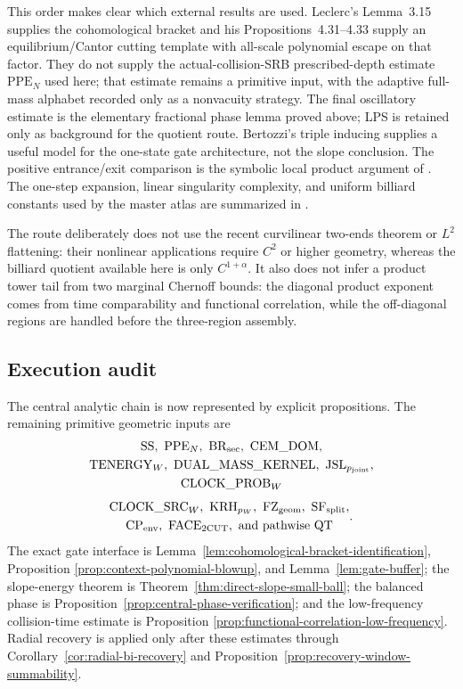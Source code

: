 \documentclass[11pt]{article}
\begin{document}
This order makes clear which external results are used.  Leclerc's
Lemma~3.15 supplies the cohomological bracket and his
Propositions~4.31--4.33 supply an equilibrium/Cantor cutting template with
all-scale polynomial escape on that factor.  They do not supply the
actual-collision-SRB prescribed-depth estimate $\mathrm{PPE}_{N}$ used here;
that estimate remains a primitive input, with the adaptive full-mass alphabet
recorded only as a nonvacuity strategy.
The final oscillatory estimate is the elementary fractional phase lemma
proved above; LPS is retained only as background for the quotient route.
Bertozzi's triple inducing supplies a useful model for the one-state gate
architecture, not the slope conclusion.  The positive entrance/exit comparison is the symbolic local
product argument of \cite{ClimenhagaLPS}.  The
one-step expansion, linear singularity complexity, and uniform billiard
constants used by the master atlas are summarized in \cite{DLreview}.

The route deliberately does not use the recent curvilinear two-ends theorem
or $L^2$ flattening: their nonlinear applications require $C^2$ or higher
geometry, whereas the billiard quotient available here is only
$C^{1+\alpha}$.  It also does not infer a product tower tail from two
marginal Chernoff bounds: the diagonal product exponent comes from time
comparability and functional correlation, while the off-diagonal regions are
handled before the three-region assembly.

\subsection{Execution audit}

The central analytic chain is now represented by explicit propositions.
The remaining primitive geometric inputs are
\[
 \begin{gathered}
 \mathrm{SS},\ \mathrm{PPE}_{N},\ \mathrm{BR}_{\rm sec},\
 \mathrm{CEM\_DOM},\\
 \mathrm{TENERGY}_{W},\ \mathrm{DUAL\_MASS\_KERNEL},\ \mathrm{JSL}_{p_{\rm joint}},\\
 \mathrm{CLOCK\_PROB}_{W}
 \end{gathered}
\]
\[
 \begin{gathered}
 \mathrm{CLOCK\_SRC}_{W},\ \mathrm{KRH}_{p_W},\
 \mathrm{FZ}_{\rm geom},\ \mathrm{SF}_{\rm split},\\
 \mathrm{CP}_{\rm env},\ \mathrm{FACE}_{\rm 2CUT},\
 \text{and pathwise }\mathrm{QT}
 \end{gathered}.
\]
The exact gate interface is
Lemma~\ref{lem:cohomological-bracket-identification}, Proposition
\ref{prop:context-polynomial-blowup}, and Lemma~\ref{lem:gate-buffer}; the
slope-energy theorem is Theorem~\ref{thm:direct-slope-small-ball}; the
balanced phase is Proposition~\ref{prop:central-phase-verification}; and the
low-frequency collision-time estimate is Proposition
\ref{prop:functional-correlation-low-frequency}.  Radial recovery is applied
only after these estimates through Corollary~\ref{cor:radial-bi-recovery} and
Proposition~\ref{prop:recovery-window-summability}.
\end{document}

